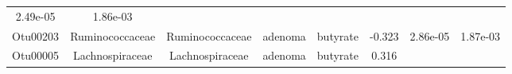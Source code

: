 \documentclass[11pt,]{article}
\begin{document}
\begin{longtable}[]{@{}cccccccc@{}}
\begin{minipage}[t]{0.08\columnwidth}
2.49e-05\strut
\end{minipage} & \begin{minipage}[t]{0.08\columnwidth}\centering\strut
1.86e-03\strut
\end{minipage}\tabularnewline
\begin{minipage}[t]{0.08\columnwidth}\centering\strut
Otu00203\strut
\end{minipage} & \begin{minipage}[t]{0.15\columnwidth}\centering\strut
Ruminococcaceae\strut
\end{minipage} & \begin{minipage}[t]{0.15\columnwidth}\centering\strut
Ruminococcaceae\strut
\end{minipage} & \begin{minipage}[t]{0.08\columnwidth}\centering\strut
adenoma\strut
\end{minipage} & \begin{minipage}[t]{0.09\columnwidth}\centering\strut
butyrate\strut
\end{minipage} & \begin{minipage}[t]{0.07\columnwidth}\centering\strut
-0.323\strut
\end{minipage} & \begin{minipage}[t]{0.08\columnwidth}\centering\strut
2.86e-05\strut
\end{minipage} & \begin{minipage}[t]{0.08\columnwidth}\centering\strut
1.87e-03\strut
\end{minipage}\tabularnewline
\begin{minipage}[t]{0.08\columnwidth}\centering\strut
Otu00005\strut
\end{minipage} & \begin{minipage}[t]{0.15\columnwidth}\centering\strut
Lachnospiraceae\strut
\end{minipage} & \begin{minipage}[t]{0.15\columnwidth}\centering\strut
Lachnospiraceae\strut
\end{minipage} & \begin{minipage}[t]{0.08\columnwidth}\centering\strut
adenoma\strut
\end{minipage} & \begin{minipage}[t]{0.09\columnwidth}\centering\strut
butyrate\strut
\end{minipage} & \begin{minipage}[t]{0.07\columnwidth}\centering\strut
0.316\strut
\end{minipage} & \begin{minipage}[t]{0.08\columnwidth}\centering\strut

\end{minipage}
\end{longtable}
\end{document}
